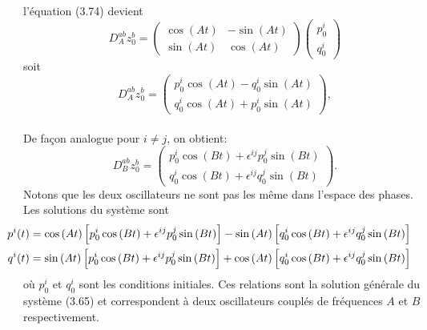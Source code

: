 \documentclass[12pt,a4paper, openany]{report}
\begin{document}
	l'équation (3.74) devient 
	\begin{equation*}
		D^{ab}_A z_0^b=
		\begin{pmatrix}
			\cos(At) & -\sin(At) \\
			\sin(At) & \cos(At)
		\end{pmatrix}  	
		\begin{pmatrix}
			p^i_0 \\
			q^i_0
		\end{pmatrix}	
	\end{equation*}
	soit
	\begin{equation}
		D^{ab}_A z_0^b=
		\begin{pmatrix}
			p_0^i \cos\left(At\right)-q_0^i \sin\left(At\right)\\
			q_0^i \cos\left(At\right)+p_0^i \sin\left(At\right)
		\end{pmatrix},	
	\end{equation}
	\\
	De façon analogue pour $i\neq j$, on obtient:
	\begin{equation}
		D^{ab}_B z_0^b=
		\begin{pmatrix}
			p_0^i \cos\left(Bt\right)+\epsilon^{ij} p_0^j \sin\left(Bt\right)\\
			q_0^i \cos\left(Bt\right)+\epsilon^{ij} q_0^j \sin\left(Bt\right)
		\end{pmatrix}.	
	\end{equation} Notons que les deux oscillateurs ne sont pas les m\^{e}me dans l'espace des phases.\\ Les solutions du système sont
	\begin{equation}
		\left.\begin{aligned}
			\hspace{-1cm}	p^i(t)&=\cos\left(At\right)\left[p_0^i\cos\left(Bt\right)+\epsilon^{ij}p_0^j\sin\left(Bt\right)\right]-\sin\left(At\right)\left[q_0^i\cos\left(Bt\right)+\epsilon^{ij}q_0^j\sin\left(Bt\right)\right]	\\	
			\hspace{-1cm}q^i(t)&=\sin\left(At\right)\left[p_0^i\cos\left(Bt\right)+\epsilon^{ij}p_0^j\sin\left(Bt\right)\right]+\cos\left(At\right)\left[q_0^i\cos\left(Bt\right)+\epsilon^{ij}q_0^j\sin\left(Bt\right)\right]
		\end{aligned}\right.
	\end{equation} où $p_0^i$ et $q_0^i$ sont les conditions initiales. Ces relations sont la solution générale du système (3.65) et correspondent à deux oscillateurs couplés de fréquences $A$ et $B$ respectivement.
\end{document}
